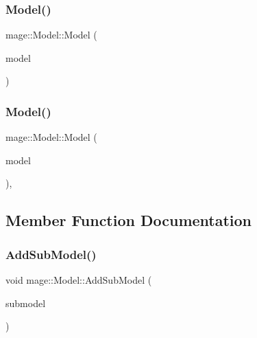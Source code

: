 \hypertarget{classmage_1_1_model_ac5f1d340bbfefd30bec3e6343a86059a}{}\label{classmage_1_1_model_ac5f1d340bbfefd30bec3e6343a86059a} 
\subsubsection{\texorpdfstring{Model()}{Model()}\hspace{0.1cm}{\footnotesize\ttfamily [2/3]}}
{\footnotesize\ttfamily mage\+::\+Model\+::\+Model (\begin{DoxyParamCaption}\item[{const \hyperlink{classmage_1_1_model}{Model} \&}]{model }\end{DoxyParamCaption})\hspace{0.3cm}{\ttfamily [protected]}}

\hypertarget{classmage_1_1_model_a085272d7cb82587094f18747ecc5aad0}{}\label{classmage_1_1_model_a085272d7cb82587094f18747ecc5aad0} 
\subsubsection{\texorpdfstring{Model()}{Model()}\hspace{0.1cm}{\footnotesize\ttfamily [3/3]}}
{\footnotesize\ttfamily mage\+::\+Model\+::\+Model (\begin{DoxyParamCaption}\item[{\hyperlink{classmage_1_1_model}{Model} \&\&}]{model }\end{DoxyParamCaption})\hspace{0.3cm}{\ttfamily [protected]}, {\ttfamily [default]}}



\subsection{Member Function Documentation}
\hypertarget{classmage_1_1_model_abf3f207329b5d4482e515e206e856295}{}\label{classmage_1_1_model_abf3f207329b5d4482e515e206e856295} 
\subsubsection{\texorpdfstring{Add\+Sub\+Model()}{AddSubModel()}}
{\footnotesize\ttfamily void mage\+::\+Model\+::\+Add\+Sub\+Model (\begin{DoxyParamCaption}\item[{\hyperlink{classmage_1_1_sub_model}{Sub\+Model} $\ast$}]{submodel }\end{DoxyParamCaption})}

